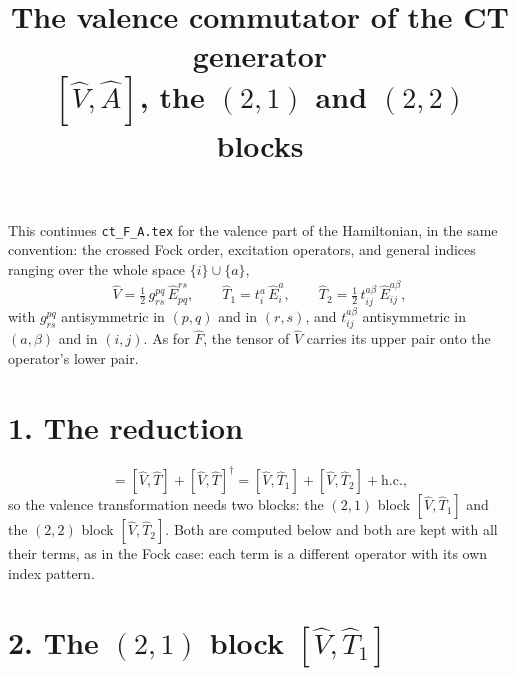 \documentclass[11pt]{article}
\title{\bfseries The valence commutator of the CT generator\\[2pt]
       \large $[\hat V,\hat A]$, the $(2,1)$ and $(2,2)$ blocks}
\author{}
\date{}
\newcommand{\E}[2]{\hat E^{#1}_{#2}}
\newcommand{\hc}{\mathrm{h.c.}}
\newcommand{\occ}{i}
\newcommand{\vir}{a}
\begin{document}
\maketitle
\vspace{-2.5em}

\noindent
This continues \texttt{ct\_F\_A.tex} for the valence part of the Hamiltonian, in
the same convention: the crossed Fock order, excitation operators, and general
indices ranging over the whole space $\{\occ\}\cup\{\vir\}$,
\begin{equation}
  \hat V=\tfrac12\,g^{pq}_{rs}\,\E{rs}{pq},
  \qquad
  \hat T_1=t^\vir_\occ\,\E{\vir}{\occ},
  \qquad
  \hat T_2=\tfrac12\,t^{\vir\beta}_{\occ j}\,\E{\vir\beta}{\occ j},
  \label{eq:ops}
\end{equation}
with $g^{pq}_{rs}$ antisymmetric in $(p,q)$ and in $(r,s)$, and
$t^{\vir\beta}_{\occ j}$ antisymmetric in $(\vir,\beta)$ and in $(\occ,j)$.
As for $\hat F$, the tensor of $\hat V$ carries its upper pair onto the
operator's lower pair.

\section*{1. The reduction}

\begin{equation}
  [\hat V,\hat A]=[\hat V,\hat T]+[\hat V,\hat T]^\dagger
   =[\hat V,\hat T_1]+[\hat V,\hat T_2]+\hc,
  \label{eq:reduce}
\end{equation}
so the valence transformation needs two blocks: the $(2,1)$ block
$[\hat V,\hat T_1]$ and the $(2,2)$ block $[\hat V,\hat T_2]$. Both are computed
below and both are kept with all their terms, as in the Fock case: each term is
a different operator with its own index pattern.

\section*{2. The \texorpdfstring{$(2,1)$}{(2,1)} block
\texorpdfstring{$[\hat V,\hat T_1]$}{[V,T1]}}
\end{document}
